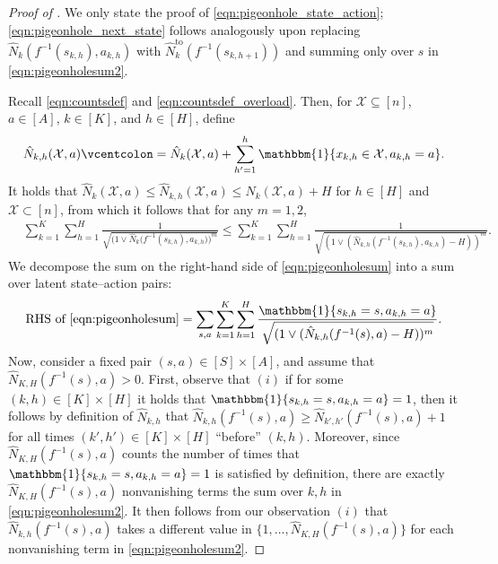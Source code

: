 \documentclass[11pt]{article}
\newcommand{\eqdef}{\vcentcolon=}
\newcommand{\mbb}[1]{\mathbbm{#1}}
\newcommand{\mcX}{\mathcal{X}}
\theoremstyle{definition}
\theoremstyle{definition}
\begin{document}
\begin{proof}[Proof of ]

	We only state the proof of \eqref{eqn:pigeonhole_state_action}; \eqref{eqn:pigeonhole_next_state} follows analogously upon replacing $\hat{N}_k(f^{-1}(s_{k,h}),a_{k,h})$ with $\hat{N}_k^{\mathrm{to}}(f^{-1}(s_{k,h+1}))$ and summing only over $s$ in \eqref{eqn:pigeonholesum2}.

	Recall \eqref{eqn:countsdef} and \eqref{eqn:countsdef_overload}.
	Then, for $\mcX\subseteq[n]$, $a\in[A]$, $k\in[K]$, and $h\in[H]$, define
	\begin{equation}
		\hat{N}_{k,h}(\mcX,a)\eqdef\hat{N}_k(\mcX,a) + \sum_{h'=1}^h\mbb{1}\{x_{k,h}\in\mcX,a_{k,h}= a\}.
	\end{equation}
	It holds that $\hat{N}_{k}(\mcX,a)\leq \hat{N}_{k,h}(\mcX,a)\leq \hat{N}_{k}(\mcX,a)+H$ for $h\in[H]$ and $\mcX\subset[n]$, from which it follows that for any $m=1,2$,
	\begin{equation}\label{eqn:pigeonholesum}
		\begin{split}
			 &
			\sum_{k=1}^K
			\sum_{h=1}^H
			\frac{1}{\sqrt{\bigl( 1 \vee \hat{N}_k\bigl( f^{-1}(s_{k,h}),a_{k,h}\bigr) \bigr)^m}}
			\leq \sum_{k=1}^K\sum_{h=1}^H\frac{1}{\sqrt{(1\vee (\hat{N}_{k,h}(f^{-1}(s_{k,h}),a_{k,h})-H))^m}}.
		\end{split}
	\end{equation}
	We decompose the sum on the right-hand side of \eqref{eqn:pigeonholesum} into a sum over latent state--action pairs:
	\begin{equation}
		\label{eqn:pigeonholesum2}
		\text{RHS of }\eqref{eqn:pigeonholesum}
		=
		\sum_{s,a}
		\sum_{k=1}^K\sum_{h=1}^H\frac{\mbb{1}\{s_{k,h}=s,a_{k,h}=a\}}{\sqrt{(1\vee(\hat{N}_{k,h}(f^{-1}(s),a)-H))^m}}
		.
	\end{equation}
	Now, consider a fixed pair $(s,a)\in[S]\times[A]$, and assume that $\hat{N}_{K,H}(f^{-1}(s),a)>0$.
	First, observe that $(i)$ if for some $(k,h)\in[K]\times[H]$ it holds that $\mbb{1}\{s_{k,h}=s,a_{k,h}=a\}=1$, then it follows by definition of $\hat{N}_{k,h}$ that $\hat{N}_{k,h}(f^{-1}(s),a)\geq\hat{N}_{k',h'}(f^{-1}(s),a)+1$ for all times $(k',h')\in[K]\times[H]$ ``before'' $(k,h)$.
	Moreover, since $\hat{N}_{K,H}(f^{-1}(s),a)$ counts the number of times that $\mbb{1}\{s_{k,h}=s,a_{k,h}=a\}=1$ is satisfied by definition, there are exactly $\hat{N}_{K,H}(f^{-1}(s),a)$ nonvanishing terms the sum over $k,h$ in \eqref{eqn:pigeonholesum2}.
	It then follows from our observation $(i)$ that $\hat{N}_{k,h}(f^{-1}(s),a)$ takes a different value in $\{1,\ldots,\hat{N}_{K,H}(f^{-1}(s),a)\}$ for each nonvanishing term in \eqref{eqn:pigeonholesum2}.

\end{proof}
\end{document}
